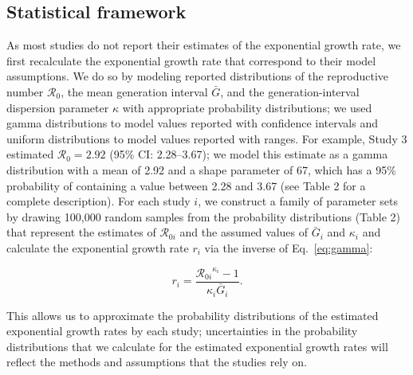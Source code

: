 \documentclass[12pt]{article}
\newcommand{\eref}[1]{Eq.~\ref{eq:#1}}
\newcommand{\Rx}[1]{\ensuremath{{\mathcal R}_{#1}}\xspace}
\newcommand{\Ro}{\ensuremath{{\mathcal R}_{0}}\xspace}
\begin{document}
\subsection{Statistical framework}

As most studies do not report their estimates of the exponential growth rate, we first recalculate the exponential growth rate that correspond to their model assumptions.
We do so by modeling reported distributions of the reproductive number \Ro, the mean generation interval $\bar G$, and the generation-interval dispersion parameter $\kappa$ with appropriate probability distributions;
we used gamma distributions to model values reported with confidence intervals and uniform distributions to model values reported with ranges.
For example, Study 3 estimated $\Ro = 2.92$ (95\% CI: 2.28--3.67);
we model this estimate as a gamma distribution with a mean of 2.92 and a shape parameter of 67, which has a 95\% probability of containing a value between 2.28 and 3.67 (see Table 2 for a complete description).
For each study $i$, we construct a family of parameter sets by drawing 100,000 random samples from the probability distributions (Table 2) that represent the estimates of \Rx{0i} and the assumed values of $\bar G_i$ and $\kappa_i$ and calculate the exponential growth rate $r_i$ via the inverse of \eref{gamma}:
\begin{linenomath*}
\begin{equation}
r_i = \frac{\Rx{0i}^{\kappa_i} - 1}{\kappa_i \bar{G}_i}.
\end{equation}
\end{linenomath*}
This allows us to approximate the probability distributions of the estimated exponential growth rates by each study;
uncertainties in the probability distributions that we calculate for the estimated exponential growth rates will reflect the methods and assumptions that the studies rely on.
\end{document}
